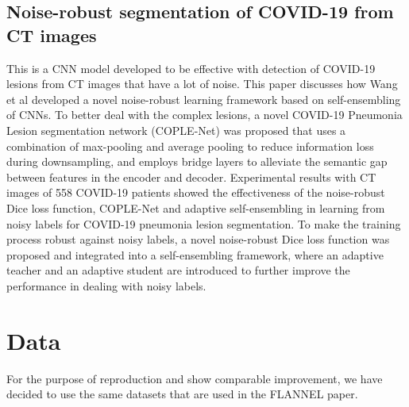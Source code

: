 \documentclass{sigkddExp}
\begin{document}
\subsection{Noise-robust segmentation of COVID-19 from CT images}

This is a CNN model \cite{wang2020covidnet} developed to be effective with
detection of COVID-19 lesions from CT images that have a lot of noise. This
paper discusses how Wang et al developed a novel noise-robust learning framework
based on self-ensembling of CNNs.  To better deal with the complex lesions, a
novel COVID-19 Pneumonia Lesion segmentation network (COPLE-Net) was proposed
that uses a combination of max-pooling and average pooling to reduce information
loss during downsampling, and employs bridge layers to alleviate the semantic
gap between features in the encoder and decoder. Experimental results with CT
images of 558 COVID-19 patients showed the effectiveness of the noise-robust
Dice loss function, COPLE-Net and adaptive self-ensembling in learning from
noisy labels for COVID-19 pneumonia lesion segmentation. To make the training
process robust against noisy labels, a novel noise-robust Dice loss function was
proposed and integrated into a self-ensembling framework, where an adaptive
teacher and an adaptive student are introduced to further improve the
performance in dealing with noisy labels.

%

\section{Data}

For the purpose of reproduction and show comparable improvement, we have decided
to use the same datasets that are used in the FLANNEL paper.
\end{document}
